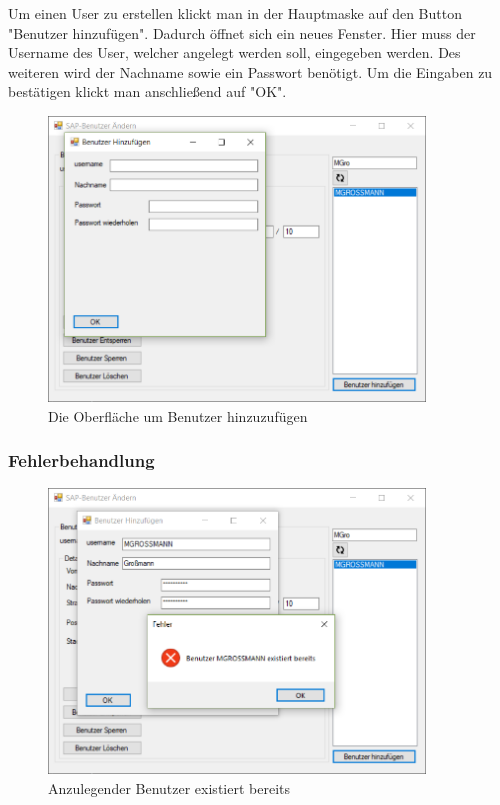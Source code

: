 Um einen User zu erstellen klickt man in der Hauptmaske auf den Button "Benutzer hinzufügen". Dadurch öffnet sich ein neues Fenster. Hier muss der Username des User, welcher angelegt werden soll, eingegeben werden. Des weiteren wird der Nachname sowie ein Passwort benötigt. Um die Eingaben zu bestätigen klickt man anschließend auf "OK". 

\begin{figure}[h]
	\begin{center}
		\includegraphics[width=10cm]{images/User_Hinzufuegen.png}
	\end{center}
	\caption{Die Oberfläche um Benutzer hinzuzufügen}
	\label{fig:user_add}
\end{figure}

\subsubsection{Fehlerbehandlung}

\begin{figure}[h]
	\begin{center}
		\includegraphics[width=10cm]{images/User_Schon_Vorhanden.png}
	\end{center}
	\caption{Anzulegender Benutzer existiert bereits}
	\label{fig:user_add_exist}
\end{figure}

